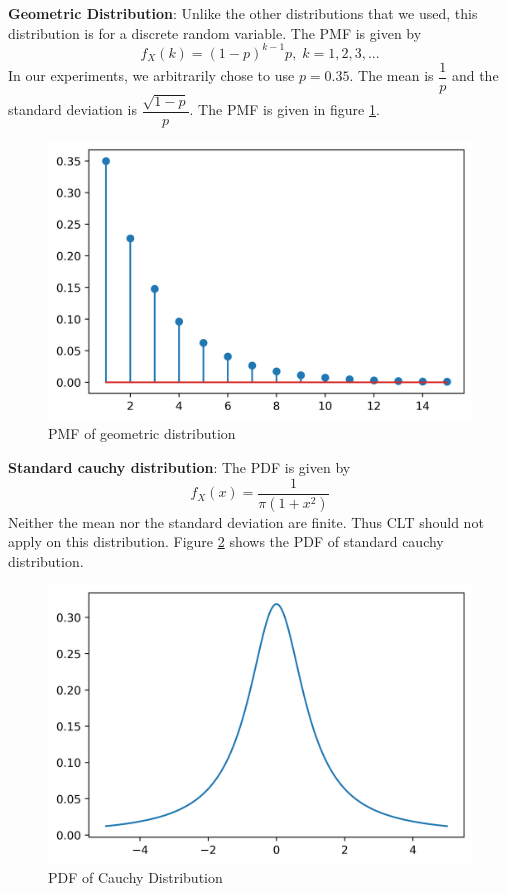 \documentclass{beamer}
\begin{document}
\begin{frame}{}
 \textbf{Geometric Distribution}: Unlike the other distributions that we used, this distribution is for a discrete random variable. The PMF is given by
    $$f_X(k) = (1-p)^{k-1}p,\; k=1,2,3,...$$
    In our experiments, we arbitrarily chose to use $p=0.35$. The mean is $\dfrac{1}{p}$ and the standard deviation is $\dfrac{\sqrt{1-p}}{p}$. The PMF is given in figure \ref{geom_pmf}. 
\end{frame}
\begin{frame}{}
    \begin{figure}[H]
        \centering
        \includegraphics[scale=0.5]{images/geometric.png}
        \caption{PMF of geometric distribution}
        \label{geom_pmf}
    \end{figure}
\end{frame}

\begin{frame}{}
\textbf{Standard cauchy distribution}: The PDF is given by $$f_X(x) = \dfrac{1}{\pi (1+x^2)}$$ Neither the mean nor the standard deviation are finite. Thus CLT should not apply on this distribution. Figure \ref{cauchy_pdf} shows the PDF of standard cauchy distribution.
\end{frame}
\begin{frame}{}
    \begin{figure}[H]
        \centering
        \includegraphics[scale=0.4]{images/cauchy.png}
        \caption{PDF of Cauchy Distribution}
        \label{cauchy_pdf}
    \end{figure}
\end{frame}
\end{document}

